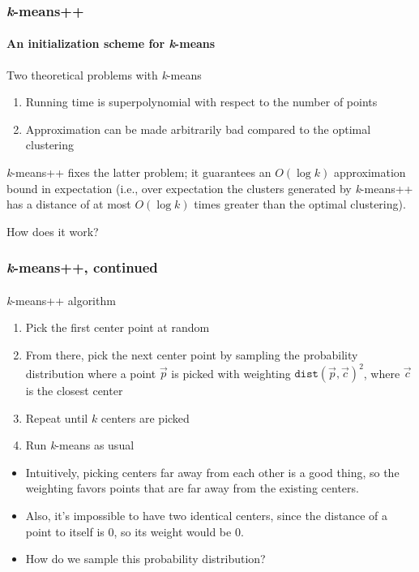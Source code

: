 \documentclass{beamer}                             %
\begin{document}
\begin{frame}
\frametitle{\textit{k}-means++}
\framesubtitle{An initialization scheme for \textit{k}-means}
\begin{block}{Two theoretical problems with \textit{k}-means}
  \begin{enumerate}
  \item Running time is superpolynomial with respect to the number of points
  \item Approximation can be made arbitrarily bad compared to the 
    optimal clustering \pause
\end{enumerate}
\end{block}

\textit{k}-means++ fixes the latter problem; it guarantees an \( O(\log k) \) 
approximation bound in expectation (i.e., over expectation the clusters
generated by \textit{k}-means++ has a distance of at most \( O(\log k) \)
times greater than the optimal clustering). \pause

How does it work?
\end{frame}

\begin{frame}
\frametitle{\textit{k}-means++, continued}
\framesubtitle{}
\begin{block}{\textit{k}-means++ algorithm}
  \begin{enumerate}
    \item Pick the first center point at random \pause
    \item From there, pick the next center point by sampling the probability
      distribution where a point \( \vec{p} \) is picked with weighting
      \( \texttt{dist}(\vec{p}, \vec{c})^2 \),
      where \( \vec{c} \) is the closest center \pause
    \item Repeat until \( k \) centers are picked
    \item Run \textit{k}-means as usual \pause
  \end{enumerate}
\end{block}
\begin{itemize}[<+->]
  \item Intuitively, picking centers far away from each other is a good thing,
    so the weighting favors points that are far away from the existing centers.
  \item Also, it's impossible to have two identical centers, since the
    distance of a point to itself is 0, so its weight would be 0.
  \item How do we sample this probability distribution?
\end{itemize} 
\end{frame}
\end{document}
